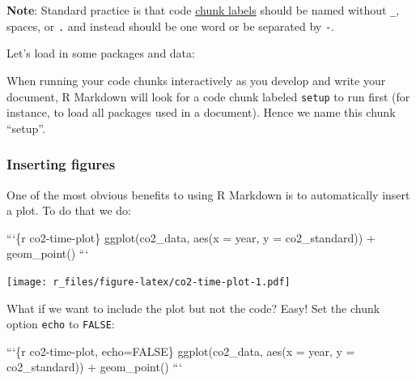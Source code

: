 \documentclass[]{Nemilov}
\newenvironment{Shaded}{\begin{snugshade}}{\end{snugshade}}
\newcommand{\BaseNTok}[1]{\textcolor[rgb]{0.00,0.00,0.81}{#1}}
\newcommand{\NormalTok}[1]{#1}
\begin{document}
\textbf{Note}: Standard practice is that code \href{https://yihui.name/knitr/options/\#chunk-options}{chunk labels} should be
named without \texttt{\_}, spaces, or \texttt{.} and instead should be one word or be separated
by \texttt{-}.

Let's load in some packages and data:

\begin{Shaded}
\end{Shaded}

When running your code chunks interactively as you develop and write your document,
R Markdown will look for a code chunk labeled \texttt{setup} to run first (for
instance, to load all packages used in a document). Hence we name this chunk ``setup''.

\hypertarget{inserting-figures}{%
\subsubsection{Inserting figures}\label{inserting-figures}}

One of the most obvious benefits to using R Markdown is to automatically insert
a plot. To do that we do:

\begin{Shaded}
\begin{Highlighting}[]
\NormalTok{```\{r co2-time-plot\}}
\NormalTok{ggplot(co2_data, aes(x = year, y = co2_standard)) +}
\BaseNTok{    geom_point()}
\NormalTok{```}
\end{Highlighting}
\end{Shaded}

\texttt{[image: r\_files/figure-latex/co2-time-plot-1.pdf]}

What if we want to include the plot but not the code? Easy! Set the chunk option
\texttt{echo} to \texttt{FALSE}:

\begin{Shaded}
\begin{Highlighting}[]
\NormalTok{```\{r co2-time-plot, echo=FALSE\}}
\NormalTok{ggplot(co2_data, aes(x = year, y = co2_standard)) +}
\BaseNTok{    geom_point()}
\NormalTok{```}
\end{Highlighting}
\end{Shaded}
\end{document}
